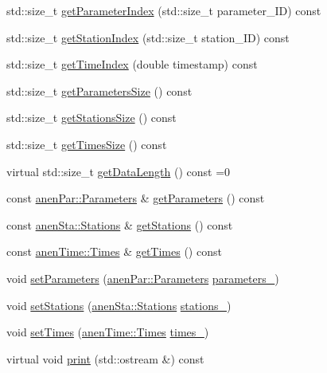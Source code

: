 \begin{DoxyCompactItemize}
\item 
std\+::size\+\_\+t \mbox{\hyperlink{class_observations_a73897578d7e1d4aaf6023857db896ee8}{get\+Parameter\+Index}} (std\+::size\+\_\+t parameter\+\_\+\+ID) const
\item 
std\+::size\+\_\+t \mbox{\hyperlink{class_observations_aa485e3d95a967b9b4efd5c4efaf0c9e1}{get\+Station\+Index}} (std\+::size\+\_\+t station\+\_\+\+ID) const
\item 
std\+::size\+\_\+t \mbox{\hyperlink{class_observations_a60c87d96be325c830c88d83bb60353ef}{get\+Time\+Index}} (double timestamp) const
\item 
std\+::size\+\_\+t \mbox{\hyperlink{class_observations_aa54d9a904c390e964103bea086e065ee}{get\+Parameters\+Size}} () const
\item 
std\+::size\+\_\+t \mbox{\hyperlink{class_observations_ada795eafca78fe436908ec66f2bb161e}{get\+Stations\+Size}} () const
\item 
std\+::size\+\_\+t \mbox{\hyperlink{class_observations_aeac31b76b1e849571bb277da8f4fe7a6}{get\+Times\+Size}} () const
\item 
virtual std\+::size\+\_\+t \mbox{\hyperlink{class_observations_a3ad688dc4ef6dc6adabe212808fd32a9}{get\+Data\+Length}} () const =0
\item 
const \mbox{\hyperlink{classanen_par_1_1_parameters}{anen\+Par\+::\+Parameters}} \& \mbox{\hyperlink{class_observations_a5347196195a72495217dc0614c9224c2}{get\+Parameters}} () const
\item 
const \mbox{\hyperlink{classanen_sta_1_1_stations}{anen\+Sta\+::\+Stations}} \& \mbox{\hyperlink{class_observations_a0f6deefe6b26a0546ea6d7642d190bfa}{get\+Stations}} () const
\item 
const \mbox{\hyperlink{classanen_time_1_1_times}{anen\+Time\+::\+Times}} \& \mbox{\hyperlink{class_observations_aa0929286a88fe261af73cc67c6c8df92}{get\+Times}} () const
\item 
void \mbox{\hyperlink{class_observations_a6965bc35582ce23ed840e9e6bf1fa228}{set\+Parameters}} (\mbox{\hyperlink{classanen_par_1_1_parameters}{anen\+Par\+::\+Parameters}} \mbox{\hyperlink{class_observations_a9e80eaaa9c096dda1dbbe8fcf631c087}{parameters\+\_\+}})
\item 
void \mbox{\hyperlink{class_observations_a01ddf7eb5d0b9c3fec31731a931cfdf4}{set\+Stations}} (\mbox{\hyperlink{classanen_sta_1_1_stations}{anen\+Sta\+::\+Stations}} \mbox{\hyperlink{class_observations_a03e2d3c69e46066f48e4381657a995f7}{stations\+\_\+}})
\item 
void \mbox{\hyperlink{class_observations_a28c65d41c60cb95607e06d090d03a8d2}{set\+Times}} (\mbox{\hyperlink{classanen_time_1_1_times}{anen\+Time\+::\+Times}} \mbox{\hyperlink{class_observations_ad379be63239b03e0db53dc31014a2d74}{times\+\_\+}})
\item 
virtual void \mbox{\hyperlink{class_observations_a523647c5ae644959f0ed583cd7b11aba}{print}} (std\+::ostream \&) const
\end{DoxyCompactItemize}
